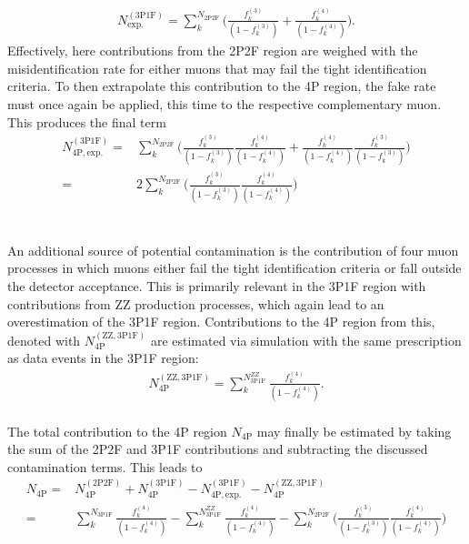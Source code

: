 \begin{align}
    N_{\mathrm{exp.}}^{\mathrm{(3P1F)}} = \sum_{k}^{N_{\mathrm{2P2F}}} \big(\frac{f_k^{(3)}}{(1-f_k^{(3)})} + \frac{f_k^{(4)}}{(1-f_k^{(4)})} \big).
\end{align}
Effectively, here contributions from the 2P2F region are weighed with the misidentification rate for either muons that may fail the tight identification criteria. To then extrapolate this contribution to the 4P region, the fake rate must once again be applied, this time to the respective complementary muon. This produces the final term
\begin{align}
    N_{\mathrm{4P, exp.}}^{\mathrm{(3P1F)}} =& \sum_{k}^{N_{\mathrm{2P2F}}} \big(\frac{f_k^{(3)}}{(1-f_k^{(3)})} \frac{f_k^{(4)}}{(1-f_k^{(4)})} + \frac{f_k^{(4)}}{(1-f_k^{(4)})}\frac{f_k^{(3)}}{(1-f_k^{(3)})} \big) \\
    = & 2 \sum_{k}^{N_{\mathrm{2P2F}}}\big(\frac{f_k^{(3)}}{(1-f_k^{(3)})} \frac{f_k^{(4)}}{(1-f_k^{(4)})})
\end{align}
\\
\\
\noindent An additional source of potential contamination is the contribution of four muon processes in which muons either fail the tight identification criteria or fall outside the detector acceptance. This is primarily relevant in the 3P1F region with contributions from ZZ production processes, which again lead to an overestimation of the 3P1F region. Contributions to the 4P region from this, denoted with $N_{\mathrm{4P}}^{\mathrm{(ZZ, 3P1F)}}$ are estimated via simulation with the same prescription as data events in the 3P1F region:
\\
\begin{align}
    N_{\mathrm{4P}}^{\mathrm{(ZZ, 3P1F)}} = \sum_{k}^{N_{\mathrm{3P1F}}^{ZZ}}\frac{f_k^{(4)}}{(1-f_k^{(4)})}.
\end{align}
\\
The total contribution to the 4P region $N_{\mathrm{4P}}$ may finally be estimated by taking the sum of the 2P2F and 3P1F contributions and subtracting the discussed contamination terms. This leads to
\begin{align}
    \label{eq:reducibleMasterEquation}
    N_{\mathrm{4P}} =& N_{\mathrm{4P}}^{\mathrm{(2P2F)}} + N_{\mathrm{4P}}^{\mathrm{(3P1F)}} - N_{\mathrm{4P, exp.}}^{\mathrm{(3P1F)}} - N_{\mathrm{4P}}^{\mathrm{(ZZ, 3P1F)}} \\
    =& \sum_{k}^{N_{\mathrm{3P1F}}}\frac{f_k^{(4)}}{(1-f_k^{(4)})} - \sum_{k}^{N_{\mathrm{3P1F}}^{ZZ}}\frac{f_k^{(4)}}{(1-f_k^{(4)})} - \sum_{k}^{N_{\mathrm{2P2F}}}\big(\frac{f_k^{(3)}}{(1-f_k^{(3)})} \frac{f_k^{(4)}}{(1-f_k^{(4)})})
\end{align}
